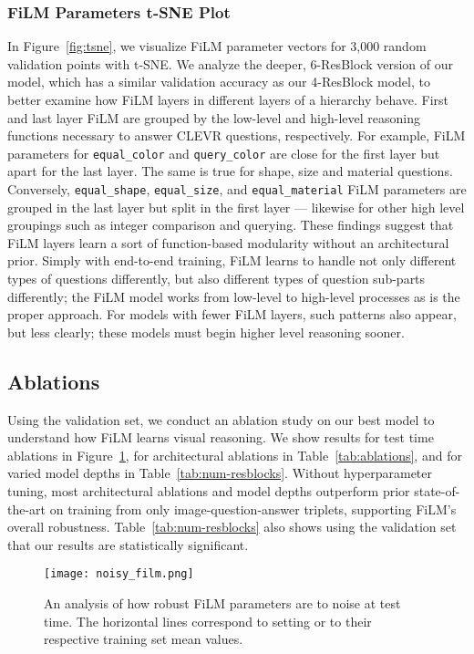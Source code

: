 \documentclass[letterpaper]{article} \usepackage{aaai18}  \usepackage{times}  \usepackage{helvet}  \usepackage{courier}  \usepackage{url}  \usepackage{graphicx}  \frenchspacing  \setlength{\pdfpagewidth}{8.5in}  \setlength{\pdfpageheight}{11in}
\begin{document}
        \subsubsection{FiLM Parameters t-SNE Plot}
        In Figure~\ref{fig:tsne}, we visualize FiLM parameter vectors  for 3,000 random validation points with t-SNE. We analyze the deeper, 6-ResBlock version of our model, which has a similar validation accuracy as our 4-ResBlock model, to better examine how FiLM layers in different layers of a hierarchy behave. First and last layer FiLM  are grouped by the low-level and high-level reasoning functions necessary to answer CLEVR questions, respectively. For example, FiLM parameters for \texttt{equal\_color} and \texttt{query\_color} are close for the first layer but apart for the last layer. The same is true for shape, size and material questions. Conversely, \texttt{equal\_shape}, \texttt{equal\_size}, and \texttt{equal\_material} FiLM parameters are grouped in the last layer but split in the first layer --- likewise for other high level groupings such as integer comparison and querying.
These findings suggest that FiLM layers learn a sort of function-based modularity without an architectural prior. Simply with end-to-end training, FiLM learns to handle not only different types of questions differently, but also different types of question sub-parts differently; the FiLM model works from low-level to high-level processes as is the proper approach. For models with fewer FiLM layers, such patterns also appear, but less clearly; these models must begin higher level reasoning sooner.

	\subsection{Ablations} \label{ablations}
    
    	Using the validation set, we conduct an ablation study on our best model to understand how FiLM learns visual reasoning. We show results for test time ablations in Figure~\ref{fig:noisy-ablations}, for architectural ablations in Table~\ref{tab:ablations}, and for varied model depths in Table~\ref{tab:num-resblocks}. Without hyperparameter tuning, most architectural ablations and model depths outperform prior state-of-the-art on training from only image-question-answer triplets, supporting FiLM's overall robustness. Table~\ref{tab:num-resblocks} also shows using the validation set that our results are statistically significant.
    
        \begin{figure}[ht]
        \centering
        \texttt{[image: noisy\_film.png]}
        \caption{\label{fig:noisy-ablations} An analysis of how robust FiLM parameters are to noise at test time. The horizontal lines correspond to setting  or  to their respective training set mean values.}
        \end{figure}
    
\end{document}
